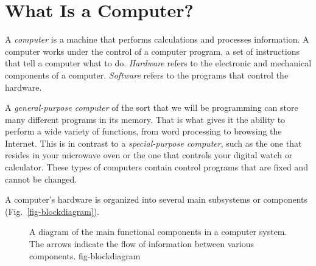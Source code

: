 \vspace{-12pt}\section{What Is a Computer?}
\label{what-isa-computer}
\noindent A {\it computer} is a machine that performs calculations and
processes information.  A computer works under the control of a
computer program, a set of instructions that tell a computer what to
do.  {\it Hardware} refers to the electronic and mechanical components
of a computer.  {\it Software} refers to the programs that control the
hardware.

A {\it general-purpose computer} of the sort that we will be
programming can store many different programs in its memory. That is
what gives it the ability to perform a wide variety of functions, from
word processing to browsing the Internet. This is in contrast to a
{\it special-purpose computer}, such as the one that resides in your
microwave oven or the one that controls your digital watch or
calculator.  These types of computers contain control programs that
are fixed and cannot be changed.

A computer's hardware is organized into several main subsystems or
components (Fig.~\ref{fig-blockdiagram}).

\begin{figure}[h]
{A diagram of the main functional
components in a computer system. The arrows indicate the flow of information
between various components.
} {fig-blockdiagram}
\end{figure}

